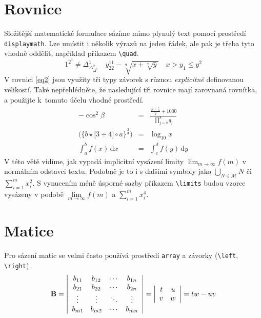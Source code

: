 \documentclass[a4paper,twocolumn,11pt]{article}[06-03-2022]
\theoremstyle{definition}
\begin{document}
\section{Rovnice}
Složitější matematické formulace sázíme mimo plynulý text pomocí prostředí \texttt{displaymath}.
Lze umístit i několik výrazů na jeden řádek, ale pak je třeba tyto vhodně oddělit, například příkazem \verb|\quad|.
\begin{displaymath}
    1^{2^3} \neq \Delta^1_{\Delta^2_{\Delta^3}}
    \quad
    y^{11}_{22} - \sqrt[9]{x + \sqrt[7]{y}}
    \quad
    x > y_1 \leq y^2
\end{displaymath}
V rovnici \eqref{eq2} jsou využity tři typy závorek s různou \textit{explicitně} definovanou velikostí.
Také nepřehlédněte, že nasledující tři rovnice mají zarovnaná rovnítka, a použijte k~tomuto účelu vhodné prostředí.
\begin{eqnarray}
    \label{eq1}
    - \cos^2 \beta & = & \frac{\frac{\frac{1}{x} + \frac{1}{3}}{y} + 1000}{\prod\limits^8_{j=2} q_j} \\
    \label{eq2}
    \bigg ( \Big \{ b \star \big [3 \div 4 \big ] \circ a \Big \}^\frac{2}{3} \bigg ) & = & \log_{10} x \\
    \label{eq3}
    \int^b_a f(x)\,\mathrm{d}x & = & \int^d_c f(y)\,\mathrm{d}y
\end{eqnarray}
V této větě vidíme, jak vypadá implicitní vysázení limity $\lim_{m\to\infty} f(m)$ v normálním odstavci textu. Podobně je to i s dalšími symboly jako $\bigcup_{N\in\mathcal{M}}N$ či $\sum^m_{i=1}x^2_i$.
S vynucením méně úsporné sazby příkazem \verb|\limits| budou vzorce vysázeny v podobě $\lim\limits_{m\to\infty} f(m)$ a $\sum\limits^m_{i=1} x^4_i$.

\section{Matice}
Pro sázení matic se velmi často používá prostředí \texttt{array} a závorky (\verb|\left|, \verb|\right|).
\begin{displaymath}
    \mathbf{B} = \left |
    \begin{array}{c c c c}
        b_{11} & b_{12} & \cdots & b_{1n} \\
        b_{21} & b_{22} & \cdots & b_{2n} \\
        \vdots & \vdots & \ddots & \vdots \\
        b_{m1} & b_{m2} & \cdots & b_{mn}
    \end{array}
    \right | = \left |
    \begin{array}{c c}
        t & u \\
        v & w \\
    \end{array}
    \right |
    = tw -uv
\end{displaymath}
\end{document}
